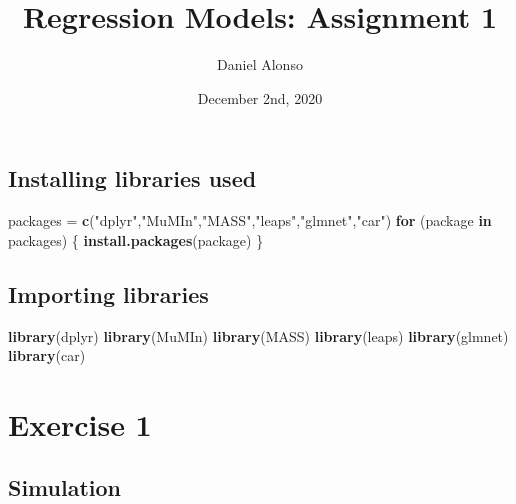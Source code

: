 \documentclass[]{article}
\title{Regression Models: Assignment 1}
\author{Daniel Alonso}
\date{December 2nd, 2020}
\newenvironment{Shaded}{\begin{snugshade}}{\end{snugshade}}
\newcommand{\ControlFlowTok}[1]{\textcolor[rgb]{0.13,0.29,0.53}{\textbf{#1}}}
\newcommand{\KeywordTok}[1]{\textcolor[rgb]{0.13,0.29,0.53}{\textbf{#1}}}
\newcommand{\NormalTok}[1]{#1}
\newcommand{\StringTok}[1]{\textcolor[rgb]{0.31,0.60,0.02}{#1}}
\begin{document}
\maketitle

\hypertarget{installing-libraries-used}{%
\subsection{Installing libraries used}\label{installing-libraries-used}}

\begin{Shaded}
\begin{Highlighting}[]
\NormalTok{packages =}\StringTok{ }\KeywordTok{c}\NormalTok{(}\StringTok{"dplyr"}\NormalTok{,}\StringTok{"MuMIn"}\NormalTok{,}\StringTok{"MASS"}\NormalTok{,}\StringTok{"leaps"}\NormalTok{,}\StringTok{"glmnet"}\NormalTok{,}\StringTok{"car"}\NormalTok{)}
\ControlFlowTok{for}\NormalTok{ (package }\ControlFlowTok{in}\NormalTok{ packages) \{}
    \KeywordTok{install.packages}\NormalTok{(package)}
\NormalTok{\}}
\end{Highlighting}
\end{Shaded}

\hypertarget{importing-libraries}{%
\subsection{Importing libraries}\label{importing-libraries}}

\begin{Shaded}
\begin{Highlighting}[]
\KeywordTok{library}\NormalTok{(dplyr)}
\KeywordTok{library}\NormalTok{(MuMIn)}
\KeywordTok{library}\NormalTok{(MASS)}
\KeywordTok{library}\NormalTok{(leaps)}
\KeywordTok{library}\NormalTok{(glmnet)}
\KeywordTok{library}\NormalTok{(car)}
\end{Highlighting}
\end{Shaded}

\newpage

\hypertarget{exercise-1}{%
\section{Exercise 1}\label{exercise-1}}

\hypertarget{simulation}{%
\subsection{Simulation}\label{simulation}}
\end{document}
